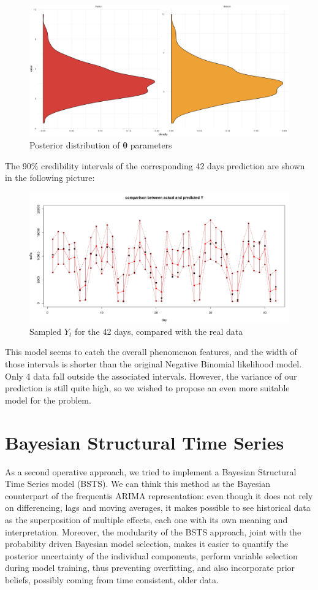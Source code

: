\documentclass[11pt,twoside]{report}
\begin{document}
	\begin{figure}[H]
		\centering
		\includegraphics[width=132 mm]{pictures/negbin_double_r_theta.png}
		\caption{Posterior distribution of $\boldsymbol{\theta}$ parameters}
		\label{fig:nb_d_theta}
	\end{figure}
	The 90$\%$ credibility intervals of the corresponding 42 days prediction are shown in the following picture:
	\begin{figure}[H]
		\centering
		\includegraphics[width=160 mm]{pictures/negbin_double_r_pred.png}
		\caption{Sampled $Y_t$ for the 42 days, compared with the real data}
		\label{fig:nb_d_pred}
	\end{figure}
	This model seems to catch the overall phenomenon features, and the width of those intervals is shorter than the original Negative Binomial likelihood model. Only 4 data fall outside the associated intervals. However, the variance of our prediction is still quite high, so we wished to propose an even more suitable model for the problem.


\section{Bayesian Structural Time Series}
As a second operative approach, we tried to implement a Bayesian Structural Time Series model (BSTS). We can think this method as the Bayesian counterpart of the frequentis ARIMA representation: even though it does not rely on differencing, lags and moving averages, it makes possible to see historical data as the superposition of multiple effects, each one with its own meaning and interpretation. Moreover, the modularity of the BSTS approach, joint with the probability driven Bayesian model selection, makes it easier to quantify the posterior uncertainty of the individual components, perform variable
selection during model training, thus preventing overfitting, and also incorporate prior beliefs, possibly coming from time consistent, older data. 
\end{document}
